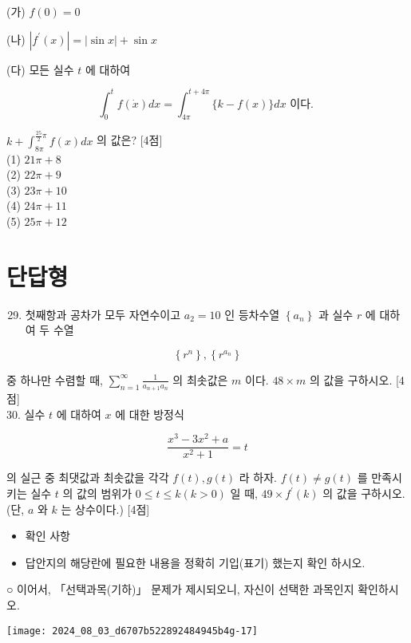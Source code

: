 \documentclass[10pt]{article}
\begin{document}
(가) \(f(0)=0\)

(나) \(\left|f^{\prime}(x)\right|=|\sin x|+\sin x\)

(다) 모든 실수 \(t\) 에 대하여

\[
\int_{0}^{t} f(\dot{x}) d x=\int_{4 \pi}^{t+4 \pi}\{k-f(x)\} d x \text { 이다. }
\]

\(k+\int_{8 \pi}^{\frac{25}{2} \pi} f(x) d x\) 의 값은? [4점]\\
(1) \(21 \pi+8\)\\
(2) \(22 \pi+9\)\\
(3) \(23 \pi+10\)\\
(4) \(24 \pi+11\)\\
(5) \(25 \pi+12\)

\section*{단답형}
\begin{enumerate}
  \setcounter{enumi}{28}
  \item 첫째항과 공차가 모두 자연수이고 \(a_{2}=10\) 인 등차수열 \(\left\{a_{n}\right\}\) 과 실수 \(r\) 에 대하여 두 수열
\end{enumerate}

\[
\left\{r^{n}\right\},\left\{r^{a_{n}}\right\}
\]

중 하나만 수렴할 때, \(\sum_{n=1}^{\infty} \frac{1}{a_{n+1} a_{n}}\) 의 최솟값은 \(m\) 이다. \(48 \times m\) 의 값을 구하시오. [4점]\\
30. 실수 \(t\) 에 대하여 \(x\) 에 대한 방정식

\[
\frac{x^{3}-3 x^{2}+a}{x^{2}+1}=t
\]

의 실근 중 최댓값과 최솟값을 각각 \(f(t), g(t)\) 라 하자. \(f(t) \neq g(t)\) 를 만족시키는 실수 \(t\) 의 값의 범위가 \(0 \leq t \leq k(k>0)\) 일 때, \(49 \times f^{\prime}(k)\) 의 값을 구하시오. (단, \(a\) 와 \(k\) 는 상수이다.) [4점]

\begin{itemize}
  \item 확인 사항
\end{itemize}

\begin{itemize}
  \item 답안지의 해당란에 필요한 내용을 정확히 기입(표기) 했는지 확인 하시오.
\end{itemize}

○ 이어서, 「선택과목(기하)」 문제가 제시되오니, 자신이 선택한 과목인지 확인하시오.

\begin{center}
\texttt{[image: 2024\_08\_03\_d6707b522892484945b4g-17]}
\end{center}
\end{document}
